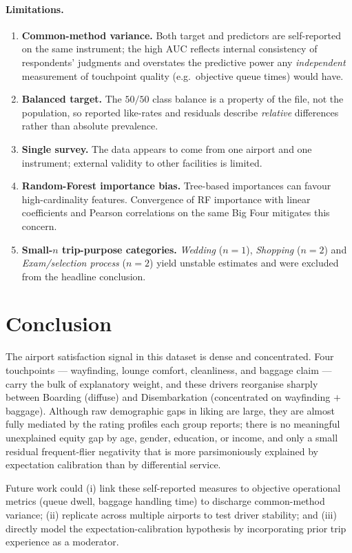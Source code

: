 \documentclass[11pt]{article}
\begin{document}
\paragraph{Limitations.}
\begin{enumerate}
\item \textbf{Common-method variance.} Both target and predictors are self-reported on the same instrument; the high AUC reflects internal consistency of respondents' judgments and overstates the predictive power any \emph{independent} measurement of touchpoint quality (e.g.\ objective queue times) would have.
\item \textbf{Balanced target.} The $50/50$ class balance is a property of the file, not the population, so reported like-rates and residuals describe \emph{relative} differences rather than absolute prevalence.
\item \textbf{Single survey.} The data appears to come from one airport and one instrument; external validity to other facilities is limited.
\item \textbf{Random-Forest importance bias.} Tree-based importances can favour high-cardinality features. Convergence of RF importance with linear coefficients and Pearson correlations on the same Big Four mitigates this concern.
\item \textbf{Small-$n$ trip-purpose categories.} \emph{Wedding} ($n=1$), \emph{Shopping} ($n=2$) and \emph{Exam/selection process} ($n=2$) yield unstable estimates and were excluded from the headline conclusion.
\end{enumerate}

\section{Conclusion}
\label{sec:conclusion}

The airport satisfaction signal in this dataset is dense and concentrated. Four touchpoints --- wayfinding, lounge comfort, cleanliness, and baggage claim --- carry the bulk of explanatory weight, and these drivers reorganise sharply between Boarding (diffuse) and Disembarkation (concentrated on wayfinding $+$ baggage). Although raw demographic gaps in liking are large, they are almost fully mediated by the rating profiles each group reports; there is no meaningful unexplained equity gap by age, gender, education, or income, and only a small residual frequent-flier negativity that is more parsimoniously explained by expectation calibration than by differential service.

Future work could (i) link these self-reported measures to objective operational metrics (queue dwell, baggage handling time) to discharge common-method variance; (ii) replicate across multiple airports to test driver stability; and (iii) directly model the expectation-calibration hypothesis by incorporating prior trip experience as a moderator.
\end{document}
